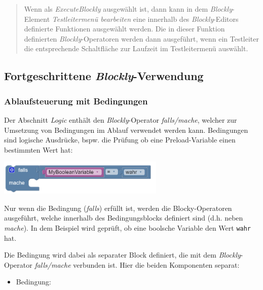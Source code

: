 \documentclass[
  letterpaper,
  DIV=11]{scrreprt}
\providecommand{\tightlist}{%
  \setlength{\itemsep}{0pt}\setlength{\parskip}{0pt}}\usepackage{longtable,booktabs,array}
\begin{document}
\begin{tcolorbox}
\begin{quote}
Wenn als \emph{ExecuteBlockly} ausgewählt ist, dann kann in dem
\emph{Blockly}-Element \emph{Testleitermenü bearbeiten} eine innerhalb
des \emph{Blockly}-Editors definierte Funktionen ausgewählt werden. Die
in dieser Funktion definierten \emph{Blockly}-Operatoren werden dann
ausgeführt, wenn ein Testleiter die entsprechende Schaltfläche zur
Laufzeit im Testleitermenü auswählt.
\end{quote}

\hypertarget{fortgeschrittene-blockly-verwendung-1}{%
\subsection{\texorpdfstring{Fortgeschrittene
\emph{Blockly}-Verwendung}{Fortgeschrittene Blockly-Verwendung}}\label{fortgeschrittene-blockly-verwendung-1}}

\hypertarget{ablaufsteuerung-mit-bedingungen-1}{%
\subsubsection{Ablaufsteuerung mit
Bedingungen}\label{ablaufsteuerung-mit-bedingungen-1}}

Der Abschnitt \emph{Logic} enthält den \emph{Blockly}-Operator
\emph{falls/mache}, welcher zur Umsetzung von Bedingungen im Ablauf
verwendet werden kann. Bedingungen sind logische Ausdrücke, bspw. die
Prüfung ob eine Preload-Variable einen bestimmten Wert hat:

\includegraphics[width=3.125in,height=\textheight]{img/screenshot-routing-block-if-then-example-01-DEU.png}

Nur wenn die Bedingung (\emph{falls}) erfüllt ist, werden die
Blocky-Operatoren ausgeführt, welche innerhalb des Bedingungsblocks
definiert sind (d.h. neben \emph{mache}). In dem Beispiel wird geprüft,
ob eine boolsche Variable den Wert \texttt{wahr} hat.

Die Bedingung wird dabei als separater Block definiert, die mit dem
\emph{Blockly}-Operator \emph{falls/mache} verbunden ist. Hier die
beiden Komponenten separat:

\begin{itemize}
\tightlist
\item
  Bedingung:
\end{itemize}


\end{tcolorbox}
\end{document}

